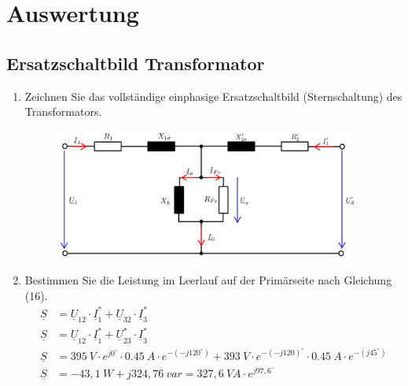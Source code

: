 \section{Auswertung}
\subsection{Ersatzschaltbild Transformator}
\begin{enumerate}[label=\alph*)]
	\item Zeichnen Sie das vollständige einphasige Ersatzschaltbild (Sternschaltung) des
	      Transformators.
	      \begin{figure}[h!]
		      \begin{center}
			      \includegraphics[width=0.95\textwidth]{img/4.1.1.1}
		      \end{center}
		      \caption{}\label{img:4.1.1.1}
	      \end{figure}

	\item Bestimmen Sie die Leistung im Leerlauf auf der Primärseite nach Gleichung (16).
	      \begin{align*}
		      \underline S & = \underline U_{12} \cdot \underline I_1^* + \underline U_{32}\cdot \underline I_3^*   \\
		      \underline S & = \underline U_{12} \cdot \underline I_1^* + \underline U_{23}^*\cdot \underline I_3^* \\
		      \underline S & = 395\ V \cdot e^{j0^\circ} \cdot 0.45\ A \cdot e^{-(-j120^\circ)} +
		      393\ V \cdot e^{-(-j120)^\circ}\cdot 0.45\ A \cdot e^{-(j45^\circ)}                                   \\
		      \underline S & = -43,1\ W + j324,76\ var = 327,6\ VA\cdot e^{j97,6^\circ}
	      \end{align*}


\end{enumerate}

